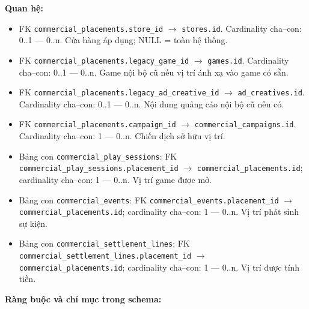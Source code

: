 \textbf{Quan hệ:}

\begin{itemize}

\item FK \texttt{commercial\_placements.store\_id} $\rightarrow$ \texttt{stores.id}. Cardinality cha--con: 0..1 — 0..n. Cửa hàng áp dụng; NULL = toàn hệ thống.

\item FK \texttt{commercial\_placements.legacy\_game\_id} $\rightarrow$ \texttt{games.id}. Cardinality cha--con: 0..1 — 0..n. Game nội bộ cũ nếu vị trí ánh xạ vào game có sẵn.

\item FK \texttt{commercial\_placements.legacy\_ad\_creative\_id} $\rightarrow$ \texttt{ad\_creatives.id}. Cardinality cha--con: 0..1 — 0..n. Nội dung quảng cáo nội bộ cũ nếu có.

\item FK \texttt{commercial\_placements.campaign\_id} $\rightarrow$ \texttt{commercial\_campaigns.id}. Cardinality cha--con: 1 — 0..n. Chiến dịch sở hữu vị trí.

\item Bảng con \texttt{commercial\_play\_sessions}: FK \texttt{commercial\_play\_sessions.placement\_id} $\rightarrow$ \texttt{commercial\_placements.id}; cardinality cha--con: 1 — 0..n. Vị trí game được mở.

\item Bảng con \texttt{commercial\_events}: FK \texttt{commercial\_events.placement\_id} $\rightarrow$ \texttt{commercial\_placements.id}; cardinality cha--con: 1 — 0..n. Vị trí phát sinh sự kiện.

\item Bảng con \texttt{commercial\_settlement\_lines}: FK \texttt{commercial\_settlement\_lines.placement\_id} $\rightarrow$ \texttt{commercial\_placements.id}; cardinality cha--con: 1 — 0..n. Vị trí được tính tiền.

\end{itemize}

\textbf{Ràng buộc và chỉ mục trong schema:}

